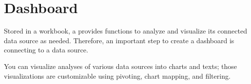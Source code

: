 \documentclass[letterpaper,10pt,english]{sphinxmanual}
\begin{document}
\section{Dashboard}
\label{\detokenize{discovery/part04/manage_dashboards:id1}}\label{\detokenize{discovery/part04/manage_dashboards::doc}}
Stored in a workbook, a  provides functions to analyze and visualize its connected data source as needed. Therefore, an important step to create a dashboard is connecting to a data source.
\begin{quote}

\begin{figure}[H]
\centering

\noindent{}
\end{figure}
\end{quote}

You can visualize analyses of various data sources into charts and texts; those visualizations are customizable using pivoting, chart mapping, and filtering.
\end{document}
